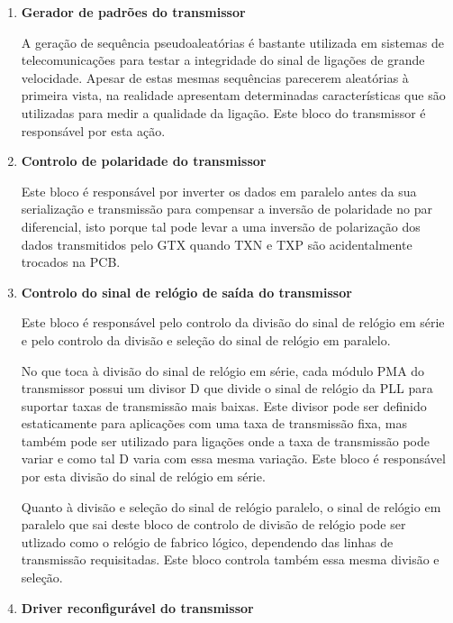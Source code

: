 \begin{enumerate}
	\item \textbf{Gerador de padrões do transmissor} 
	
	\hspace{1.0em}A geração de sequência pseudoaleatórias é bastante utilizada em sistemas de telecomunicações para testar a integridade do sinal de ligações de grande velocidade. Apesar de estas mesmas sequências parecerem aleatórias à primeira vista, na realidade apresentam determinadas características que são utilizadas para medir a qualidade da ligação. Este bloco do transmissor é responsável por esta ação. 
	
	\item \textbf{Controlo de polaridade do transmissor} 
	
	\hspace{1.0em}Este bloco é responsável por inverter os dados em paralelo antes da sua serialização e transmissão para compensar a inversão de polaridade no par diferencial, isto porque tal pode levar a uma inversão de polarização dos dados transmitidos pelo GTX quando TXN e TXP são acidentalmente trocados na PCB. 
	
	\item \textbf{Controlo do sinal de relógio de saída do transmissor}
	
	\hspace{1.0em}Este bloco é responsável pelo controlo da divisão do sinal de relógio em série e pelo controlo da divisão e seleção do sinal de relógio em paralelo.
	
	\hspace{1.0em}No que toca à divisão do sinal de relógio em série, cada módulo PMA do transmissor possui um divisor D que divide o sinal de relógio da PLL para suportar taxas de transmissão mais baixas. Este divisor pode ser definido estaticamente para aplicações com uma taxa de transmissão fixa, mas também pode ser utilizado para ligações onde a taxa de transmissão pode variar e como tal D varia com essa mesma variação. Este bloco é responsável por esta divisão do sinal de relógio em série. 
	
	\hspace{1.0em}Quanto à divisão e seleção do sinal de relógio paralelo, o sinal de relógio em paralelo que sai deste bloco de controlo de divisão de relógio pode ser utlizado como o relógio de fabrico lógico, dependendo das linhas de transmissão requisitadas. Este bloco controla também essa mesma divisão e seleção.
	
	\item \textbf{Driver reconfigurável do transmissor}
	

\end{enumerate}
